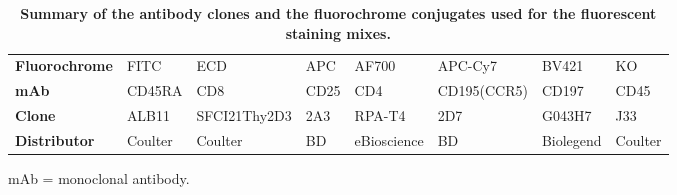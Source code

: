 \documentclass{book}
\begin{document}
\begin{refsection}
\begin{table}[H] %
  \tiny
  \begin{tabular}{l|lllllll}
    \hline
    \textbf{Fluorochrome} & FITC    & ECD          & APC         & AF700       & APC-Cy7     & BV421     & KO \\
    \textbf{mAb}          & CD45RA  & CD8          & CD25        & CD4         & CD195(CCR5) & CD197     & CD45 \\
    \textbf{Clone}        & ALB11   & SFCI21Thy2D3 & 2A3         & RPA-T4      & 2D7         & G043H7    & J33 \\
    \textbf{Distributor}  & Coulter & Coulter      & BD          & eBioscience & BD          & Biolegend & Coulter \\
    \hline
  \end{tabular}
  \caption{\label{tab:chp5suptab1}
  \textbf{Summary of the antibody clones and the fluorochrome conjugates used for the fluorescent staining mixes.}}
  \small
  mAb = monoclonal antibody.
\end{table}



\end{refsection}
\end{document}

